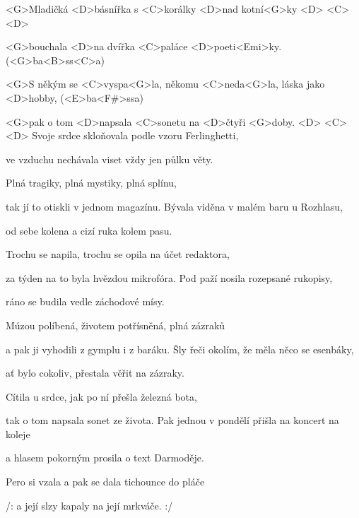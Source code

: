 
\zs
<G>Mladičká <D>básnířka s <C>korálky <D>nad kotní<G>ky <D> <C> <D>

<G>bouchala <D>na dvířka <C>paláce <D>poeti<Emi>ky.
\ifdefined\TPBAND
	(<G>ba<B>ss<C>a)
\fi

<G>S někým se <C>vyspa<G>la, někomu <C>neda<G>la, láska jako <D>hobby,
\ifdefined\TPBAND
	(<E>ba<F#>ssa)
\fi

<G>pak o tom <D>napsala <C>sonetu na <D>čtyři 
<G>doby. <D> <C> <D>
\ks
\zs
Svoje srdce skloňovala podle vzoru Ferlinghetti,

ve vzduchu nechávala viset vždy jen půlku věty.

Plná tragiky, plná mystiky,
plná splínu,

tak jí to otiskli v jednom magazínu.
\ks
\zs
Bývala viděna v malém baru u Rozhlasu,

od sebe kolena a cizí ruka kolem pasu.

Trochu se napila, trochu se opila
na účet redaktora,

za týden na to byla hvězdou mikrofóra.
\ks
\zs
Pod paží nosila rozepsané rukopisy,

ráno se budila vedle záchodové mísy.

Múzou políbená, životem potřísněná,
plná zázraků

a pak ji vyhodili z gymplu i z baráku.
\ks
\zs
Šly řeči okolím, že měla něco se esenbáky,

ať bylo cokoliv, přestala věřit na zázraky.

Cítila u srdce, jak po ní přešla
železná bota,

tak o tom napsala sonet ze života.
\ks
\zs
Pak jednou v pondělí přišla na koncert na koleje

a hlasem pokorným prosila o text Darmoděje.

Pero si vzala a pak se dala
tichounce do pláče

/: a její slzy kapaly na její mrkváče. :/
\ks
\kp

